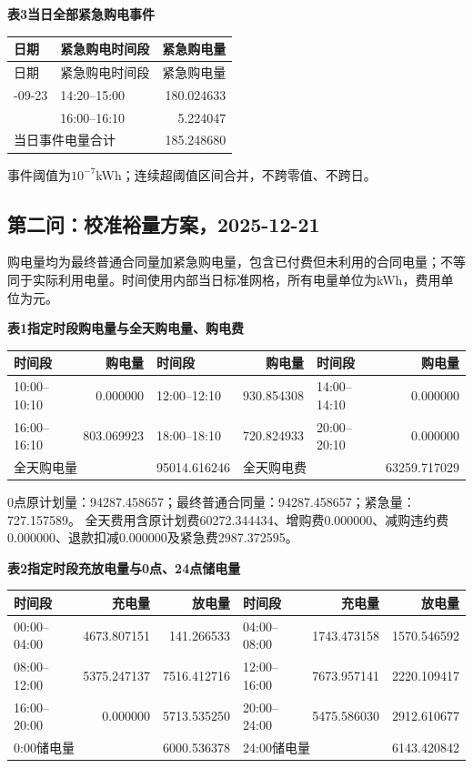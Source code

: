\begin{center}\textbf{表3\quad 当日全部紧急购电事件}\end{center}
\begin{longtable}{llr}\toprule 日期 & 紧急购电时间段 & 紧急购电量\\\midrule\endfirsthead
\toprule 日期 & 紧急购电时间段 & 紧急购电量\\\midrule\endhead
\bottomrule\endfoot
2025-09-23 & 14:20--15:00 & 180.024633\\
 & 16:00--16:10 & 5.224047\\
\midrule\multicolumn{2}{l}{当日事件电量合计} & 185.248680\\
\end{longtable}
\noindent 事件阈值为$10^{-7}$kWh；连续超阈值区间合并，不跨零值、不跨日。
\endgroup
\clearpage
\subsection{第二问：校准裕量方案，2025-12-21}
\begingroup\small
\setlength{\tabcolsep}{4pt}\renewcommand{\arraystretch}{1.08}
\setlength{\LTpre}{4pt}\setlength{\LTpost}{4pt}
\noindent 购电量均为最终普通合同量加紧急购电量，包含已付费但未利用的合同电量；不等同于实际利用电量。时间使用内部当日标准网格，所有电量单位为kWh，费用单位为元。
\begin{center}\textbf{表1\quad 指定时段购电量与全天购电量、购电费}\par\smallskip
\begin{tabular}{lr lr lr}\toprule
时间段 & 购电量 & 时间段 & 购电量 & 时间段 & 购电量\\\midrule
10:00--10:10 & 0.000000 & 12:00--12:10 & 930.854308 & 14:00--14:10 & 0.000000\\
16:00--16:10 & 803.069923 & 18:00--18:10 & 720.824933 & 20:00--20:10 & 0.000000\\
\midrule
\multicolumn{2}{l}{全天购电量} & 95014.616246 & \multicolumn{2}{l}{全天购电费} & 63259.717029\\
\bottomrule\end{tabular}\end{center}
\noindent 0点原计划量：94287.458657；最终普通合同量：94287.458657；紧急量：727.157589。
全天费用含原计划费60272.344434、增购费0.000000、减购违约费0.000000、退款扣减0.000000及紧急费2987.372595。
\begin{center}\textbf{表2\quad 指定时段充放电量与0点、24点储电量}\par\smallskip
\begin{tabular}{lrr lrr}\toprule
时间段 & 充电量 & 放电量 & 时间段 & 充电量 & 放电量\\\midrule
00:00--04:00 & 4673.807151 & 141.266533 & 04:00--08:00 & 1743.473158 & 1570.546592\\
08:00--12:00 & 5375.247137 & 7516.412716 & 12:00--16:00 & 7673.957141 & 2220.109417\\
16:00--20:00 & 0.000000 & 5713.535250 & 20:00--24:00 & 5475.586030 & 2912.610677\\
\midrule
\multicolumn{2}{l}{0:00储电量} & 6000.536378 & \multicolumn{2}{l}{24:00储电量} & 6143.420842\\
\bottomrule\end{tabular}\end{center}
